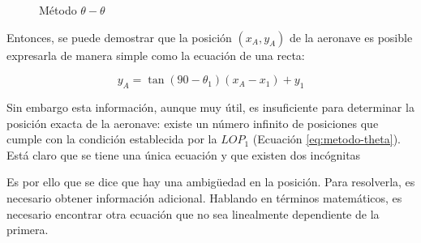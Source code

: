\documentclass[a4paper,12pt,twoside]{article}
\begin{document}
\begin{figure}[!h]
  \centering
  \caption{M\'etodo $\theta-\theta$}
\end{figure}

Entonces, se puede demostrar que la posici\'on $(x_A, y_A)$ de la aeronave es posible expresarla de manera simple como la ecuaci\'on de una recta:


\begin{equation}\label{eq:metodo-theta}
 y_A = \tan (90-\theta_1) (x_A-x_1) + y_1
 \end{equation}





Sin embargo esta informaci\'on, aunque muy \'util, es insuficiente para determinar la posici\'on exacta de la aeronave: existe un n\'umero infinito de posiciones que cumple con la condici\'on establecida por la $LOP_{1}$ (Ecuaci\'on \ref{eq:metodo-theta}). Est\'a claro que se tiene una \'unica ecuaci\'on y que existen dos inc\'ognitas

Es por ello que se dice que hay una ambigüedad en la posici\'on. Para resolverla, es necesario obtener informaci\'on adicional. Hablando en t\'erminos matem\'aticos, es necesario encontrar otra ecuaci\'on que no sea linealmente dependiente de la primera.
\end{document}
